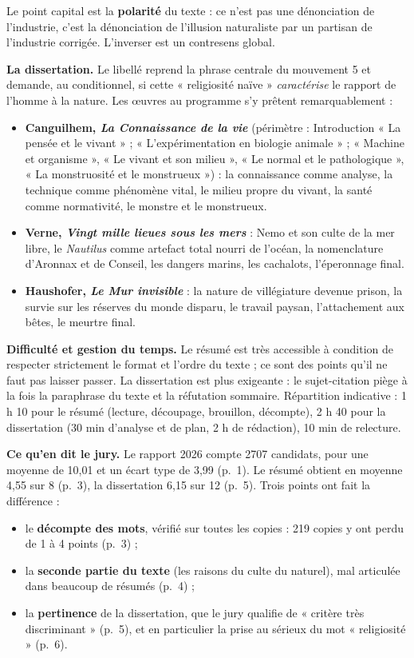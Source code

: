\documentclass[11pt,a4paper]{article}
\providecommand{\tightlist}{\setlength{\itemsep}{0pt}\setlength{\parskip}{0pt}}
\begin{document}
Le point capital est la \textbf{polarité} du texte : ce n'est pas une dénonciation de l'industrie, c'est la dénonciation de l'illusion naturaliste par un partisan de l'industrie corrigée. L'inverser est un contresens global.

\textbf{La dissertation.} Le libellé reprend la phrase centrale du mouvement 5 et demande, au conditionnel, si cette « religiosité naïve » \emph{caractérise} le rapport de l'homme à la nature. Les œuvres au programme s'y prêtent remarquablement :

\begin{itemize}
\tightlist
\item
  \textbf{Canguilhem, \emph{La Connaissance de la vie}} (périmètre : Introduction « La pensée et le vivant » ; « L'expérimentation en biologie animale » ; « Machine et organisme », « Le vivant et son milieu », « Le normal et le pathologique », « La monstruosité et le monstrueux ») : la connaissance comme analyse, la technique comme phénomène vital, le milieu propre du vivant, la santé comme normativité, le monstre et le monstrueux.
\item
  \textbf{Verne, \emph{Vingt mille lieues sous les mers}} : Nemo et son culte de la mer libre, le \emph{Nautilus} comme artefact total nourri de l'océan, la nomenclature d'Aronnax et de Conseil, les dangers marins, les cachalots, l'éperonnage final.
\item
  \textbf{Haushofer, \emph{Le Mur invisible}} : la nature de villégiature devenue prison, la survie sur les réserves du monde disparu, le travail paysan, l'attachement aux bêtes, le meurtre final.
\end{itemize}

\textbf{Difficulté et gestion du temps.} Le résumé est très accessible à condition de respecter strictement le format et l'ordre du texte ; ce sont des points qu'il ne faut pas laisser passer. La dissertation est plus exigeante : le sujet-citation piège à la fois la paraphrase du texte et la réfutation sommaire. Répartition indicative : 1 h 10 pour le résumé (lecture, découpage, brouillon, décompte), 2 h 40 pour la dissertation (30 min d'analyse et de plan, 2 h de rédaction), 10 min de relecture.

\textbf{Ce qu'en dit le jury.} Le rapport 2026 compte 2707 candidats, pour une moyenne de 10,01 et un écart type de 3,99 (p.~1). Le résumé obtient en moyenne 4,55 sur 8 (p.~3), la dissertation 6,15 sur 12 (p.~5). Trois points ont fait la différence :

\begin{itemize}
\tightlist
\item
  le \textbf{décompte des mots}, vérifié sur toutes les copies : 219 copies y ont perdu de 1 à 4 points (p.~3) ;
\item
  la \textbf{seconde partie du texte} (les raisons du culte du naturel), mal articulée dans beaucoup de résumés (p.~4) ;
\item
  la \textbf{pertinence} de la dissertation, que le jury qualifie de « critère très discriminant » (p.~5), et en particulier la prise au sérieux du mot « religiosité » (p.~6).
\end{itemize}
\end{document}
